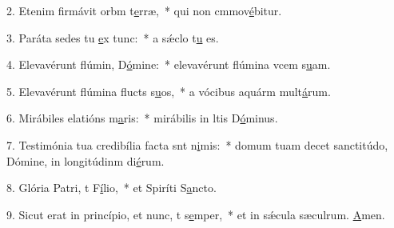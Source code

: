 2. Etenim firmávit orbm t\uline{e}rræ,~* qui non cmmov\uline{é}bitur.\par 
3. Paráta sedes tu \uline{e}x tunc:~* a sǽclo t\uline{u} es.\par 
4. Elevavérunt flúmin, D\uline{ó}mine:~* elevavérunt flúmina vcem s\uline{u}am.\par 
5. Elevavérunt flúmina flucts s\uline{u}os,~* a vócibus aquárm mult\uline{á}rum.\par 
6. Mirábiles elatións m\uline{a}ris:~* mirábilis in ltis D\uline{ó}minus.\par 
7. Testimónia tua credibília facta snt n\uline{i}mis:~* domum tuam decet sanctitúdo, Dómine, in longitúdinm di\uline{é}rum.\par 
8. Glória Patri, t F\uline{í}lio,~* et Spiríti S\uline{a}ncto.\par 
9. Sicut erat in princípio, et nunc, t s\uline{e}mper,~* et in sǽcula sæculrum. \uline{A}men.\par 

